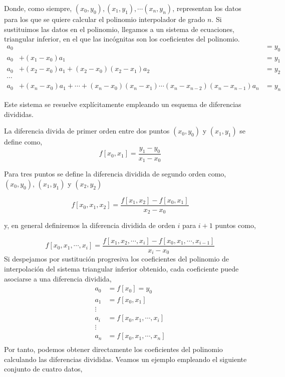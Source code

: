 Donde, como siempre, $(x_0, y_0), (x_1,y_1), \cdots (x_n, y_n)$, representan los datos para los que se quiere calcular el polinomio interpolador de grado $n$. Si sustituimos las datos en el polinomio, llegamos a un sistema de ecuaciones, triangular inferior, en el que las incógnitas son los coeficientes del polinomio.
\begin{align*}
a_0&&=y_0\\
a_0&+(x_1-x_0)a_1&=y_1\\
a_0&+(x_2-x_0)a_1+(x_2-x_0)(x_2-x_1)a_2&=y_2\\
\cdots\\
a_0&+(x_n-x_0)a_1+\cdots+(x_n-x_0)(x_n-x_1)\cdots (x_n-x_{n-2})(x_n-x_{n-1})a_n&=y_n
\end{align*}

Este sistema se resuelve explícitamente empleando un esquema de diferencias divididas. 

La diferencia divida de primer orden entre dos puntos $(x_0,y_0)$ y $(x_1,y_1)$ se define como,
\begin{equation*}
f\left[x_0,x_1\right]=\frac{y_1-y_0}{x_1-x_0}
\end{equation*}														

Para tres puntos se define la diferencia dividida de segundo orden como, $(x_0,y_0)$, $(x_1,y_1)$ y $(x_2,y_2)$

\begin{equation*}
f\left[x_0,x_1,x_2\right]=\frac{f\left[x_1,x_2\right]-f\left[x_0,x_1\right]}{x_2-x_0}
\end{equation*}

y, en general definiremos la diferencia dividida de orden $i$ para $i+1$ puntos como,

\begin{equation*}
f\left[x_0,x_1,\cdots,x_i\right]=\frac{f\left[x_1,x_2,\cdots,x_i\right]-f\left[x_0,x_1,\cdots,x_{i-1}\right]}{x_i-x_0}
\end{equation*}																												
Si despejamos por sustitución progresiva los coeficientes del polinomio de interpolación del sistema triangular inferior obtenido, cada coeficiente puede asociarse a una diferencia dividida,
\begin{align*}
a_0&=f\left[x_0\right]=y_0\\
a_1&=f\left[x_0,x_1\right]\\
\vdots\\
a_i&=f\left[x_0,x_1,\cdots,x_i\right]\\
\vdots\\
a_n&=f\left[x_0,x_1,\cdots,x_n\right]\\
\end{align*}																								
Por tanto, podemos obtener directamente los coeficientes del polinomio calculando las diferencias divididas. Veamos un ejemplo empleando el siguiente conjunto de cuatro datos,

